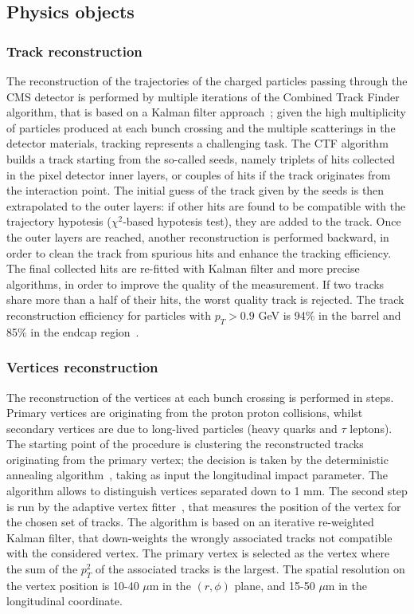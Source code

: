 \subsection{Physics objects}

\subsubsection{Track reconstruction}
The reconstruction of the trajectories of the charged particles passing through the CMS detector is performed by multiple iterations of the Combined Track Finder algorithm, that is based on a Kalman filter approach~\cite{Fruhwirth:1987fm}; given the high multiplicity of particles produced at each bunch crossing and the multiple scatterings in the detector materials, tracking represents a challenging task. The CTF algorithm builds a track starting from the so-called seeds, namely triplets of hits collected in the pixel detector inner layers, or couples of hits if the track originates from the interaction point. The initial guess of the track given by the seeds is then extrapolated to the outer layers: if other hits are found to be compatible with the trajectory hypotesis ($\chi^2$-based hypotesis test), they are added to the track. Once the outer layers are reached, another reconstruction is performed backward, in order to clean the track from spurious hits and enhance the tracking efficiency. The final collected hits are re-fitted with Kalman filter and more precise algorithms, in order to improve the quality of the measurement. If two tracks share more than a half of their hits, the worst quality track is rejected. The track reconstruction efficiency for particles with $p_T >0.9$ GeV is 94\% in the barrel and 85\% in the endcap region~\cite{Chatrchyan:2014fea}.\\


\subsubsection{Vertices reconstruction}
The reconstruction of the vertices at each bunch crossing is performed in steps. Primary vertices are originating from the proton proton collisions, whilst secondary vertices are due to long-lived particles (heavy quarks and $\tau$ leptons). The starting point of the procedure is clustering the reconstructed tracks originating from the primary vertex; the decision is taken by the deterministic annealing algorithm~\cite{bib:detanneal}, taking as input the longitudinal impact parameter. The algorithm allows to distinguish vertices separated down to 1 mm. The second step is run by the adaptive vertex fitter~\cite{Fruhwirth:2007hz}, that measures the position of the vertex for the chosen set of tracks. The algorithm is based on an iterative re-weighted Kalman filter, that down-weights the wrongly associated tracks not compatible with the considered vertex. The primary vertex is selected as the vertex where the sum of the $p_T^2$ of the associated tracks is the largest. The spatial resolution on the vertex position is 10-40 $\mu$m in the $(r, \phi)$ plane, and 15-50 $\mu$m in the longitudinal coordinate.

